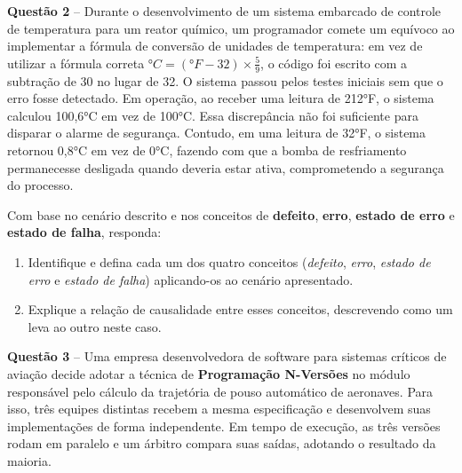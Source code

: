 \documentclass[12pt,a4paper]{article}
\newcommand{\resposta}[1]{
\noindent
\framebox[\textwidth]{
\begin{minipage}{0.98\textwidth}
\vspace*{#1}\null
\end{minipage}
}
}
\begin{document}
\vspace{0.5cm}

\textbf{Questão 2} -- Durante o desenvolvimento de um sistema embarcado de controle de temperatura para um reator químico, um programador comete um equívoco ao implementar a fórmula de conversão de unidades de temperatura: em vez de utilizar a fórmula correta $°C = (°F - 32) \times \frac{5}{9}$, o código foi escrito com a subtração de 30 no lugar de 32. O sistema passou pelos testes iniciais sem que o erro fosse detectado. Em operação, ao receber uma leitura de 212°F, o sistema calculou 100,6°C em vez de 100°C. Essa discrepância não foi suficiente para disparar o alarme de segurança. Contudo, em uma leitura de 32°F, o sistema retornou 0,8°C em vez de 0°C, fazendo com que a bomba de resfriamento permanecesse desligada quando deveria estar ativa, comprometendo a segurança do processo.

\vspace{0.2cm}

Com base no cenário descrito e nos conceitos de \textbf{defeito}, \textbf{erro}, \textbf{estado de erro} e \textbf{estado de falha}, responda:

\begin{enumerate}[label=\textbf{\alph*)}]
    \item Identifique e defina cada um dos quatro conceitos (\textit{defeito}, \textit{erro}, \textit{estado de erro} e \textit{estado de falha}) aplicando-os ao cenário apresentado.
    \item Explique a relação de causalidade entre esses conceitos, descrevendo como um leva ao outro neste caso.
\end{enumerate}

\vspace{0.2cm}
\resposta{7cm}

\vspace{0.5cm}

\textbf{Questão 3} -- Uma empresa desenvolvedora de software para sistemas críticos de aviação decide adotar a técnica de \textbf{Programação N-Versões} no módulo responsável pelo cálculo da trajetória de pouso automático de aeronaves. Para isso, três equipes distintas recebem a mesma especificação e desenvolvem suas implementações de forma independente. Em tempo de execução, as três versões rodam em paralelo e um árbitro compara suas saídas, adotando o resultado da maioria.
\end{document}

